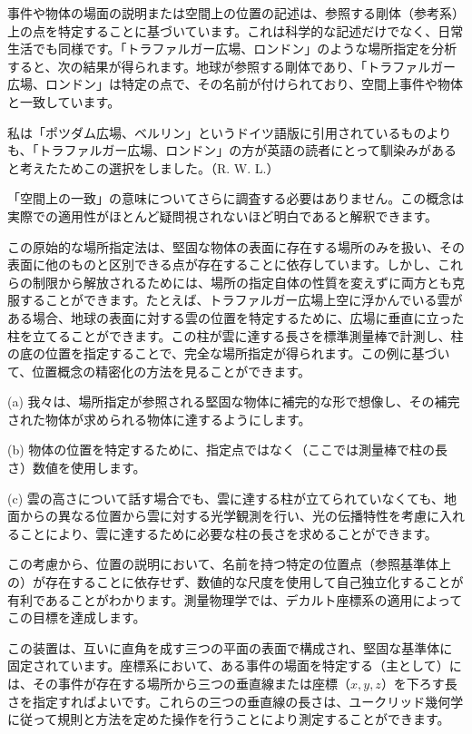 \documentclass[a4paper,11pt,openany]{ltjsbook}
\begin{document}
事件や物体の場面の説明または空間上の位置の記述は、参照する剛体（参考系）上の点を特定することに基づいています。これは科学的な記述だけでなく、日常生活でも同様です。「トラファルガー広場、ロンドン」のような場所指定を分析すると、次の結果が得られます。地球が参照する剛体であり、「トラファルガー広場、ロンドン」は特定の点で、その名前が付けられており、空間上事件や物体と一致しています。

 私は「ポツダム広場、ベルリン」というドイツ語版に引用されているものよりも、「トラファルガー広場、ロンドン」の方が英語の読者にとって馴染みがあると考えたためこの選択をしました。（R. W. L.）

 「空間上の一致」の意味についてさらに調査する必要はありません。この概念は実際での適用性がほとんど疑問視されないほど明白であると解釈できます。

この原始的な場所指定法は、堅固な物体の表面に存在する場所のみを扱い、その表面に他のものと区別できる点が存在することに依存しています。しかし、これらの制限から解放されるためには、場所の指定自体の性質を変えずに両方とも克服することができます。たとえば、トラファルガー広場上空に浮かんでいる雲がある場合、地球の表面に対する雲の位置を特定するために、広場に垂直に立った柱を立てることができます。この柱が雲に達する長さを標準測量棒で計測し、柱の底の位置を指定することで、完全な場所指定が得られます。この例に基づいて、位置概念の精密化の方法を見ることができます。

(a) 我々は、場所指定が参照される堅固な物体に補完的な形で想像し、その補完された物体が求められる物体に達するようにします。

(b) 物体の位置を特定するために、指定点ではなく（ここでは測量棒で柱の長さ）数値を使用します。

(c) 雲の高さについて話す場合でも、雲に達する柱が立てられていなくても、地面からの異なる位置から雲に対する光学観測を行い、光の伝播特性を考慮に入れることにより、雲に達するために必要な柱の長さを求めることができます。

この考慮から、位置の説明において、名前を持つ特定の位置点（参照基準体上の）が存在することに依存せず、数値的な尺度を使用して自己独立化することが有利であることがわかります。測量物理学では、デカルト座標系の適用によってこの目標を達成します。


この装置は、互いに直角を成す三つの平面の表面で構成され、堅固な基準体に固定されています。座標系において、ある事件の場面を特定する（主として）には、その事件が存在する場所から三つの垂直線または座標（$x, y, z$）を下ろす長さを指定すればよいです。これらの三つの垂直線の長さは、ユークリッド幾何学に従って規則と方法を定めた操作を行うことにより測定することができます。
\end{document}
